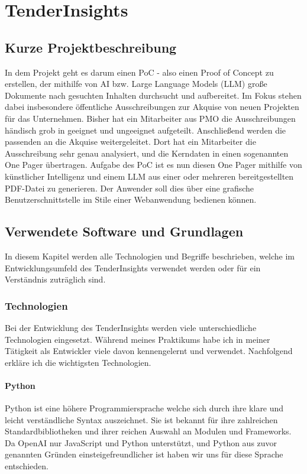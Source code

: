 \chapter{TenderInsights}

\section{Kurze Projektbeschreibung}
In dem Projekt geht es darum einen PoC - also einen Proof of Concept zu erstellen, der mithilfe von AI bzw. Large
Language Models (LLM) große Dokumente nach gesuchten Inhalten durchsucht und aufbereitet. Im Fokus stehen dabei
insbesondere öffentliche Ausschreibungen zur Akquise von neuen Projekten für das Unternehmen. Bisher hat ein Mitarbeiter
aus PMO die Ausschreibungen händisch grob in geeignet und ungeeignet aufgeteilt. Anschließend werden die passenden an
die Akquise weitergeleitet. Dort hat ein Mitarbeiter die Ausschreibung sehr genau analysiert, und die Kerndaten in einen
sogenannten One Pager übertragen. Aufgabe des PoC ist es nun diesen One Pager mithilfe von künstlicher Intelligenz und
einem LLM aus einer oder mehreren bereitgestellten PDF-Datei zu generieren. Der Anwender soll dies über eine grafische
Benutzerschnittstelle im Stile einer Webanwendung bedienen können.

\section{Verwendete Software und Grundlagen}
In diesem Kapitel werden alle Technologien und Begriffe beschrieben, welche im Entwicklungsumfeld des TenderInsights
verwendet werden oder für ein Verständnis zuträglich sind.

\subsection{Technologien}
Bei der Entwicklung des TenderInsights werden viele unterschiedliche Technologien eingesetzt. Während meines Praktikums
habe ich in meiner Tätigkeit als Entwickler viele davon kennengelernt und verwendet. Nachfolgend erkläre ich die
wichtigsten Technologien.

\subsubsection{Python}
Python ist eine höhere Programmiersprache welche sich durch ihre klare und leicht verständliche Syntax auszeichnet. Sie
ist bekannt für ihre zahlreichen Standardbibliotheken und ihrer reichen Auswahl an Modulen und Frameworks. Da OpenAI nur
JavaScript und Python unterstützt, und Python aus zuvor genannten Gründen einsteigefreundlicher ist haben wir uns für
diese Sprache entschieden.

